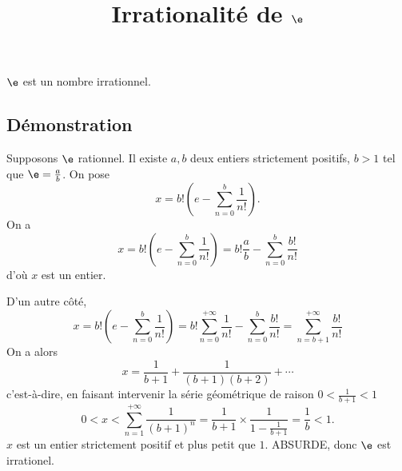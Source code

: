 \documentclass[fontsize=12pt,twoside=false,parskip=half, french]{scrartcl}
\title{Irrationalité de $\e$}
\date{}
\author{}
\begin{document}
\maketitle
   \begin{Theoreme}[Irrationalité de $\e$]
      $\e$ est un nombre irrationnel.
   \end{Theoreme}
   \subsection{Démonstration}
      Supposons $\e$ rationnel. Il existe $a, b$ deux entiers strictement positifs, $b > 1$ tel que  $\e = \frac{a}{b}$.
      On pose
      \[
         x = b!\left(e - \sum_{n = 0}^b \frac{1}{n!}\right).
      \]
      On a 
      \[
         x =  b!\left(e - \sum_{n = 0}^b \frac{1}{n!}\right) = b! \frac{a}{b} - \sum_{n = 0}^b \frac{b!}{n!}
      \]
      d’où $x$ est un entier.
      
      D’un autre côté,
      \[
         x = b!\left(e - \sum_{n = 0}^b \frac{1}{n!}\right) = b! \sum_{n = 0}^{+\infty} \frac{1}{n!} - \sum_{n = 0}^b \frac{b!}{n!}
                                                           = \sum_{n = b + 1}^{+\infty} \frac{b!}{n!}
      \]
      On a alors
      \[
         x = \frac{1}{b + 1} + \frac{1}{(b + 1)(b + 2)} + \cdots 
      \]
      c’est-à-dire, en faisant intervenir la série géométrique de raison $0 < \frac{1}{b + 1} < 1$ 
      \[
         0 < x < \sum_{n = 1}^{+\infty} \frac{1}{(b + 1)^n} = \frac{1}{b + 1} \times \frac{1}{1 - \frac{1}{b + 1}} = \frac{1}{b} < 1.
      \]
      $x$ est un entier strictement positif et plus petit que $1$. ABSURDE, donc $\e$ est irrationel.
\end{document}

